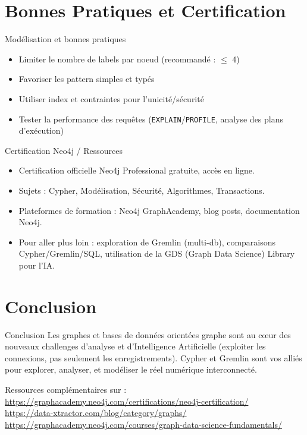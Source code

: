\documentclass{beamer}
\begin{document}
\section{Bonnes Pratiques et Certification}
\begin{frame}{Modélisation et bonnes pratiques}
  \begin{itemize}
    \item Limiter le nombre de labels par noeud (recommandé : $\leq$ 4)
    \item Favoriser les pattern simples et typés
    \item Utiliser index et contraintes pour l’unicité/sécurité
    \item Tester la performance des requêtes (\texttt{EXPLAIN}/\texttt{PROFILE}, analyse des plans d’exécution)
  \end{itemize}
\end{frame}

\begin{frame}{Certification Neo4j / Ressources}
  \begin{itemize}
    \item Certification officielle Neo4j Professional gratuite, accès en ligne.
    \item Sujets : Cypher, Modélisation, Sécurité, Algorithmes, Transactions.
    \item Plateformes de formation : Neo4j GraphAcademy, blog posts, documentation Neo4j.
    \item Pour aller plus loin : exploration de Gremlin (multi-db), comparaisons Cypher/Gremlin/SQL, utilisation de la GDS (Graph Data Science) Library pour l’IA.
  \end{itemize}
\end{frame}

\section*{Conclusion}
\begin{frame}{Conclusion}
\vspace{0.5cm}
\Large
Les graphes et bases de données orientées graphe sont au cœur des nouveaux challenges d’analyse et d’Intelligence Artificielle (exploiter les connexions, pas seulement les enregistrements).  
Cypher et Gremlin sont vos alliés pour explorer, analyser, et modéliser le réel numérique interconnecté.  
\bigskip

\footnotesize
Ressources complémentaires sur :\\
\url{https://graphacademy.neo4j.com/certifications/neo4j-certification/} \\
\url{https://data-xtractor.com/blog/category/graphs/} \\
\url{https://graphacademy.neo4j.com/courses/graph-data-science-fundamentals/}

\end{frame}
\end{document}
